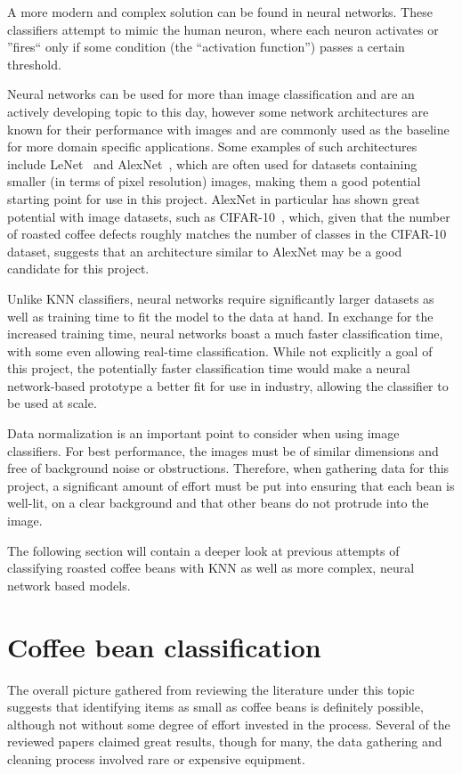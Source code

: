 A more modern and complex solution can be found in neural networks. These classifiers
attempt to mimic the human neuron, where each neuron activates or ''fires`` only
if some condition (the ``activation function'') passes a certain threshold.

Neural networks can be used for more than image classification and are an
actively developing topic to this day, however some network architectures are known
for their performance with images and are commonly used as the baseline for more
domain specific applications. Some examples of such architectures include LeNet~\cite{leNetOverview}
and AlexNet~\cite{alexNetOverview}, which are often used for datasets containing
smaller (in terms of pixel resolution) images, making them a good potential
starting point for use in this project. AlexNet in particular has shown great potential
with image datasets, such as CIFAR-10~\cite{cifar10}, which, given that the
number of roasted coffee defects roughly matches the number of classes in the
CIFAR-10 dataset, suggests that an architecture similar to AlexNet may be a good
candidate for this project.

Unlike KNN classifiers, neural networks require significantly larger datasets as
well as training time to fit the model to the data at hand. In exchange for the increased
training time, neural networks boast a much faster classification time, with some
even allowing real-time classification. While not explicitly a goal of this
project, the potentially faster classification time would make a neural network-based
prototype a better fit for use in industry, allowing the classifier to be used
at scale.

Data normalization is an important point to consider when using image
classifiers. For best performance, the images must be of similar dimensions and
free of background noise or obstructions. Therefore, when gathering data for
this project, a significant amount of effort must be put into ensuring that each
bean is well-lit, on a clear background and that other beans do not protrude
into the image.

The following section will contain a deeper look at previous attempts of
classifying roasted coffee beans with KNN as well as more complex, neural network
based models.

\section{Coffee bean classification}
\label{sec:lit-review-coffee} The overall picture gathered from reviewing the literature
under this topic suggests that identifying items as small as coffee beans is definitely
possible, although not without some degree of effort invested in the process. Several
of the reviewed papers claimed great results, though for many, the data gathering
and cleaning process involved rare or expensive equipment.


